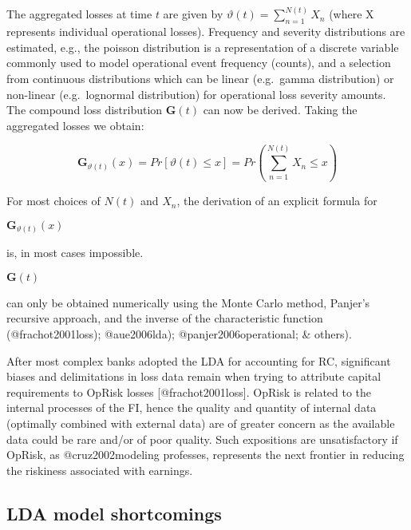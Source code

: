 \documentclass[]{article}
\begin{document}
The aggregated losses at time \(t\) are given by
\(\vartheta(t) = \sum_{n=1}^{N(t)} X_{n}\) (where X represents
individual operational losses). Frequency and severity distributions are
estimated, e.g., the poisson distribution is a representation of a
discrete variable commonly used to model operational event frequency
(counts), and a selection from continuous distributions which can be
linear (e.g.~gamma distribution) or non-linear (e.g.~lognormal
distribution) for operational loss severity amounts. The compound loss
distribution \(\mathbf{G}(t)\) can now be derived. Taking the aggregated
losses we obtain:

\begin{equation}\label{eqn1}
\mathbf{G}_{\vartheta(t)}(x)=Pr[\vartheta(t)\leq x]=Pr\left(\sum_{n=1}^{N(t)}X_{n} \leq x\right)
\end{equation}

For most choices of \(N(t)\) and \(X_{n}\), the derivation of an
explicit formula for

\begin{math}\mathbf{G}_{\vartheta(t)}(x) \end{math}

is, in most cases impossible.

\begin{math} \mathbf{G}(t)\end{math}

can only be obtained numerically using the Monte Carlo method, Panjer's
recursive approach, and the inverse of the characteristic function
(@frachot2001loss); @aue2006lda); @panjer2006operational; \& others).
\medskip

After most complex banks adopted the LDA for accounting for RC,
significant biases and delimitations in loss data remain when trying to
attribute capital requirements to OpRisk losses {[}@frachot2001loss{]}.
OpRisk is related to the internal processes of the FI, hence the quality
and quantity of internal data (optimally combined with external data)
are of greater concern as the available data could be rare and/or of
poor quality. Such expositions are unsatisfactory if OpRisk, as
@cruz2002modeling professes, represents the next frontier in reducing
the riskiness associated with earnings.

\subsection{LDA model shortcomings}
\label{ssec:LDA model shortcomings}
\end{document}
